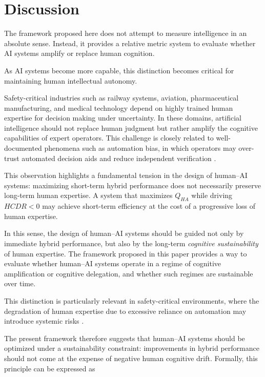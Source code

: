 \documentclass[11pt]{article}
\begin{document}
\section{Discussion}

The framework proposed here does not attempt to measure intelligence
in an absolute sense. Instead, it provides a relative metric system
to evaluate whether AI systems amplify or replace human cognition.

As AI systems become more capable, this distinction becomes critical
for maintaining human intellectual autonomy.

Safety-critical industries such as railway systems, aviation,
pharmaceutical manufacturing, and medical technology depend on
highly trained human expertise for decision making under uncertainty.
In these domains, artificial intelligence should not replace human
judgment but rather amplify the cognitive capabilities of expert
operators. This challenge is closely related to well-documented
phenomena such as automation bias, in which operators may
over-trust automated decision aids and reduce independent
verification \cite{automation-bias,overreliance-ai}.

This observation highlights a fundamental tension in the design of
human--AI systems: maximizing short-term hybrid performance does not
necessarily preserve long-term human expertise. A system that maximizes
$Q_{HA}$ while driving $HCDR < 0$ may achieve short-term efficiency at
the cost of a progressive loss of human expertise.

In this sense, the design of human--AI systems should be guided not
only by immediate hybrid performance, but also by the long-term
\emph{cognitive sustainability} of human expertise. The framework
proposed in this paper provides a way to evaluate whether human--AI
systems operate in a regime of cognitive amplification or cognitive
delegation, and whether such regimes are sustainable over time.

This distinction is particularly relevant in safety-critical
environments, where the degradation of human expertise due to
excessive reliance on automation may introduce systemic risks
\cite{overreliance-ai,automation-bias}.

The present framework therefore suggests that human--AI systems should
be optimized under a sustainability constraint: improvements in hybrid
performance should not come at the expense of negative human cognitive
drift. Formally, this principle can be expressed as
\end{document}
